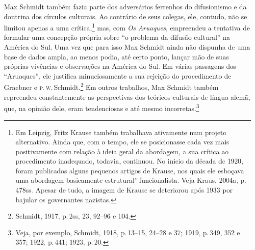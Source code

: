 Max Schmidt também fazia parte dos adversários ferrenhos do
difusionismo e da doutrina dos círculos culturais. Ao contrário de seus
colegas, ele, contudo, não se limitou apenas a uma crítica,\footnote{Em
  Leipzig, Fritz Krause também trabalhava ativamente num projeto
  alternativo. Ainda que, com o tempo, ele se posicionasse cada vez mais
  positivamente com relação à ideia geral da abordagem, a sua crítica ao
  procedimento inadequado, todavia, continuou. No início da década de
  1920, foram publicados alguns pequenos artigos de Krause, nos quais
  ele esboçava uma abordagem basicamente estrutural"-funcionalista. Veja
  Kraus, 2004a, p.\,478ss. Apesar de tudo, a imagem de Krause se
  deteriorou após 1933 por bajular os governantes nazistas.} mas, com
\textit{Os Aruaques}, empreendeu a tentativa de formular uma concepção
própria sobre ``o problema da difusão cultural'' na América do Sul. Uma
vez que para isso Max Schmidt ainda não dispunha de uma base de dados
ampla, ao menos podia, até certo ponto, lançar mão de suas próprias
vivências e observações na América do Sul. Em várias passagens dos
``Aruaques'', ele justifica minuciosamente a sua rejeição do
procedimento de Graebner e \textsc{p}.\,\textsc{w}.\,Schmidt.\footnote{Schmidt, 1917, p.\,2ss, 
23, 92--96 e 104.} Em %
outros trabalhos, Max Schmidt também repreendeu constantemente as
perspectivas dos teóricos culturais de língua alemã, que, na opinião
dele, eram tendenciosas e até mesmo incorretas.\footnote{Veja, por
  exemplo, Schmidt, 1918, p.\,13--15, 24--28 e 37; 1919, p.\,349, 352 e 357;
  1922, p.\,441; 1923, p.\,20.}

